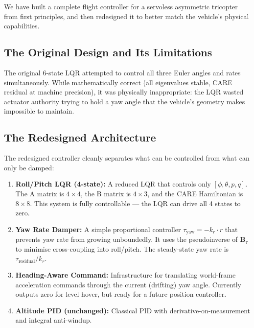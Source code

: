 \documentclass[12pt, a4paper]{article}
\newcommand{\bB}{\bm{B}}
\begin{document}
We have built a complete flight controller for a servoless asymmetric tricopter from first principles, and then redesigned it to better match the vehicle's physical capabilities.

\subsection{The Original Design and Its Limitations}

The original 6-state LQR attempted to control all three Euler angles and rates simultaneously.  While mathematically correct (all eigenvalues stable, CARE residual at machine precision), it was physically inappropriate: the LQR wasted actuator authority trying to hold a yaw angle that the vehicle's geometry makes impossible to maintain.

\subsection{The Redesigned Architecture}

The redesigned controller cleanly separates what can be controlled from what can only be damped:

\begin{enumerate}
    \item \textbf{Roll/Pitch LQR (4-state):}  A reduced LQR that controls only $[\phi, \theta, p, q]$.  The A matrix is $4 \times 4$, the B matrix is $4 \times 3$, and the CARE Hamiltonian is $8 \times 8$.  This system is fully controllable --- the LQR can drive all 4 states to zero.

    \item \textbf{Yaw Rate Damper:}  A simple proportional controller $\tau_{\text{yaw}} = -k_r \cdot r$ that prevents yaw rate from growing unboundedly.  It uses the pseudoinverse of $\bB_\tau$ to minimise cross-coupling into roll/pitch.  The steady-state yaw rate is $\tau_{\text{residual}} / k_r$.

    \item \textbf{Heading-Aware Command:}  Infrastructure for translating world-frame acceleration commands through the current (drifting) yaw angle.  Currently outputs zero for level hover, but ready for a future position controller.

    \item \textbf{Altitude PID (unchanged):}  Classical PID with derivative-on-measurement and integral anti-windup.
\end{enumerate}
\end{document}

